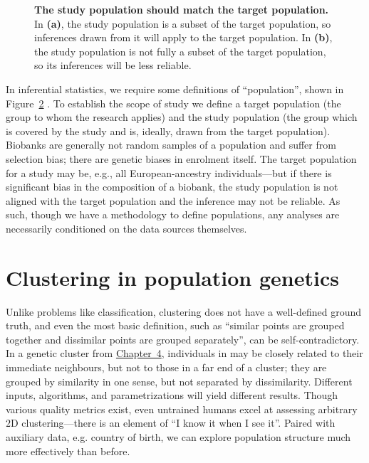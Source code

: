 \begin{figure}[ht]
\begin{subfigure}{0.45\linewidth}
    \caption{}
    \label{fig:statistical_populations2}
\end{subfigure}
\caption[The relationship between target and study populations]{\textbf{The study population should match the target population.} In \textbf{(a)}, the study population is a subset of the target population, so inferences drawn from it will apply to the target population. In \textbf{(b)}, the study population is not fully a subset of the target population, so its inferences will be less reliable.}
\label{fig:statistical_populations}
\end{figure}

In inferential statistics, we require some definitions of ``population'', shown in Figure~\ref{fig:statistical_populations} . To establish the scope of study we define a target population (the group to whom the research applies) and the study population (the group which is covered by the study and is, ideally, drawn from the target population)\citep{statcan2003}. Biobanks are generally not random samples of a population and suffer from selection bias\citep{huang_representativeness_2021}; there are genetic biases in enrolment itself\citep{pirastu_genetic_2021,benonisdottir_studying_2023}. The target population for a study may be, e.g., all European-ancestry individuals---but if there is significant bias in the composition of a biobank, the study population is not aligned with the target population and the inference may not be reliable. As such, though we have a methodology to define populations, any analyses are necessarily conditioned on the data sources themselves.

\section{Clustering in population genetics}

Unlike problems like classification, clustering does not have a well-defined ground truth, and even the most basic definition, such as ``similar points are grouped together and dissimilar points are grouped separately'', can be self-contradictory\citep{ben-david_clustering_2018}. In a genetic cluster from \hyperref[chap:chapter4]{Chapter~4}, individuals in may be closely related to their immediate neighbours, but not to those in a far end of a cluster; they are grouped by similarity in one sense, but not separated by dissimilarity. Different inputs, algorithms, and parametrizations will yield different results. Though various quality metrics exist, even untrained humans excel at assessing arbitrary $2$D clustering\citep{lewis_human_2012}---there is an element of ``I know it when I see it''. Paired with auxiliary data, e.g. country of birth, we can explore population structure much more effectively than before.

